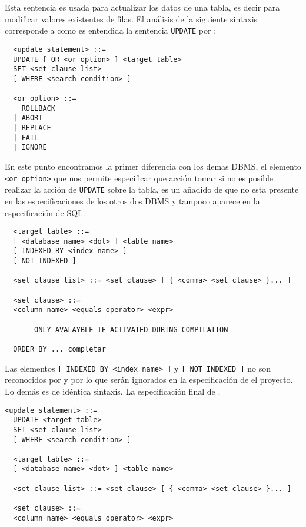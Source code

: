 Esta sentencia es usada para actualizar los datos de una tabla, es decir para modificar valores existentes de filas. El análisis de la siguiente sintaxis corresponde a como es entendida la sentencia \verb=UPDATE= por \s: 

\begin{Verbatim}
  <update statement> ::=
  UPDATE [ OR <or option> ] <target table> 
  SET <set clause list>
  [ WHERE <search condition> ]
  
  <or option> ::=
    ROLLBACK
  | ABORT
  | REPLACE
  | FAIL
  | IGNORE
\end{Verbatim}

En este punto encontramos la primer diferencia con los demas DBMS, el elemento \verb=<or option>= que nos permite especificar que acción tomar si no es posible realizar la acción de \verb=UPDATE= sobre la tabla, es un añadido de \s que no esta presente en las especificaciones de los otros dos DBMS y tampoco aparece en la especificación de SQL.

\begin{Verbatim}
  <target table> ::=
  [ <database name> <dot> ] <table name>
  [ INDEXED BY <index name> ]
  [ NOT INDEXED ]
  
  <set clause list> ::= <set clause> [ { <comma> <set clause> }... ]

  <set clause> ::=
  <column name> <equals operator> <expr>
  
  -----ONLY AVALAYBLE IF ACTIVATED DURING COMPILATION---------
  
  ORDER BY ... completar

\end{Verbatim}
Las elementos \verb=[ INDEXED BY <index name> ]= y \verb=[ NOT INDEXED ]= no son reconocidos por \m y \p por lo que serán ignorados en la especificación de el proyecto. Lo demás es de idéntica sintaxis. La especificación final de \jj.

\begin{Verbatim}[frame=single, label=sintaxis para UPDATE]
  <update statement> ::=
  UPDATE <target table> 
  SET <set clause list>
  [ WHERE <search condition> ]
  
  <target table> ::=
  [ <database name> <dot> ] <table name>
  
  <set clause list> ::= <set clause> [ { <comma> <set clause> }... ]

  <set clause> ::=
  <column name> <equals operator> <expr>    
\end{Verbatim}




